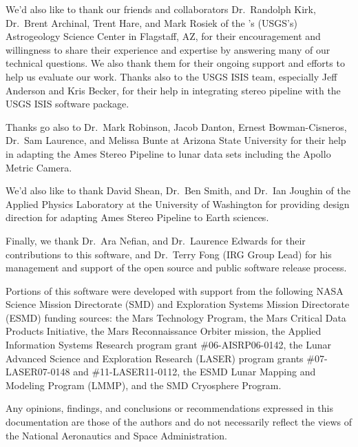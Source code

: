 We'd also like to thank our friends and collaborators Dr.~Randolph
Kirk, Dr.~Brent Archinal, Trent Hare, and Mark Rosiek of the
's (\acs{USGS}'s) Astrogeology Science Center in Flagstaff,
AZ, for their encouragement and willingness to share their experience
and expertise by answering many of our technical questions.  We also
thank them for their ongoing support and efforts to help us evaluate
our work.  Thanks also to the \ac{USGS} \ac{ISIS} team, especially
Jeff Anderson and Kris Becker, for their help in integrating stereo
pipeline with the \ac{USGS} \ac{ISIS} software package.

Thanks go also to Dr.~Mark Robinson, Jacob Danton, Ernest
Bowman-Cisneros, Dr.~Sam Laurence, and Melissa Bunte at Arizona State
University for their help in adapting the Ames Stereo Pipeline to
lunar data sets including the Apollo Metric Camera.

We'd also like to thank David Shean, Dr.~Ben Smith, and Dr.~Ian
Joughin of the Applied Physics Laboratory at the University of
Washington for providing design direction for adapting Ames Stereo
Pipeline to Earth sciences.

Finally, we thank Dr.~Ara Nefian, and Dr.~Laurence Edwards for their
contributions to this software, and Dr.~Terry Fong (IRG Group
Lead) for his management and support of the open source and public
software release process.

Portions of this software were developed with support from the
following NASA Science Mission Directorate (SMD) and Exploration
Systems Mission Directorate (ESMD) funding sources: the Mars
Technology Program, the Mars Critical Data Products Initiative, the
Mars Reconnaissance Orbiter mission, the Applied Information Systems
Research program grant \#06-AISRP06-0142, the Lunar Advanced Science
and Exploration Research (LASER) program grants \#07-LASER07-0148 and
\#11-LASER11-0112, the ESMD Lunar Mapping and Modeling Program (LMMP),
and the SMD Cryosphere Program.

Any opinions, findings, and conclusions or recommendations expressed
in this documentation are those of the authors and do not necessarily
reflect the views of the National Aeronautics and Space Administration.
